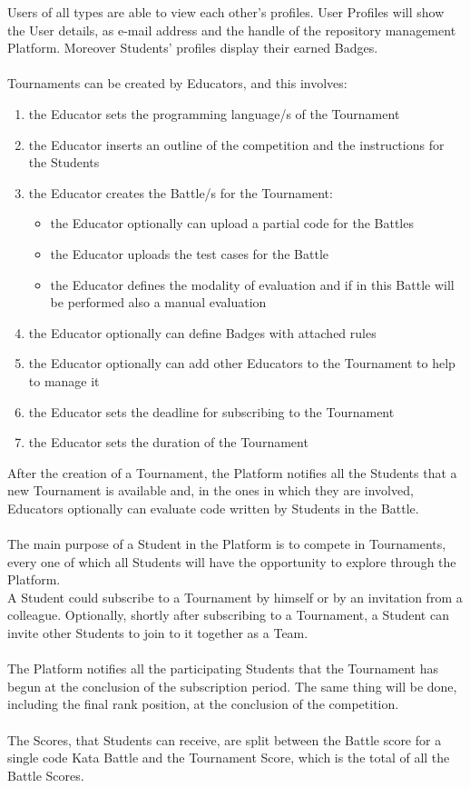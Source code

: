 Users of all types are able to view each other's profiles. User Profiles will show the User details, as e-mail address and the handle of the repository management Platform. Moreover Students' profiles display their earned Badges.\\
\\
Tournaments can be created by Educators, and this involves:
\begin{enumerate}[label=$\bullet$]
    \item the Educator sets the programming language/s of the Tournament
    \item the Educator inserts an outline of the competition and the instructions for the Students
    \item the Educator creates the Battle/s for the Tournament:
    \begin{itemize}
        \item the Educator optionally can upload a partial code for the Battles
        \item the Educator uploads the test cases for the Battle
        \item the Educator defines the modality of evaluation and if in this Battle will be performed also a manual evaluation
    \end{itemize}
    \item the Educator optionally can define Badges with attached rules
    \item the Educator optionally can add other Educators to the Tournament to help to manage it
    \item the Educator sets the deadline for subscribing to the Tournament
    \item the Educator sets the duration of the Tournament
\end{enumerate}
After the creation of a Tournament, the Platform notifies all the Students that a new Tournament is available and, in the ones in which they are involved, Educators optionally can evaluate code written by Students in the Battle.
\\
\\
The main purpose of a Student in the Platform is to compete in Tournaments, every one of which all Students will have the opportunity to explore through the Platform. \\

A Student could subscribe to a Tournament by himself or by an invitation from a colleague. Optionally, shortly after subscribing to a Tournament, a Student can invite other Students to join to it together as a Team.\\
\\
The Platform notifies all the participating Students that the Tournament has begun at the conclusion of the subscription period. The same thing will be done, including the final rank position, at the conclusion of the competition.\\
\\
The Scores, that Students can receive, are split between the Battle score for a single code Kata Battle and the Tournament Score, which is the total of all the Battle Scores.

